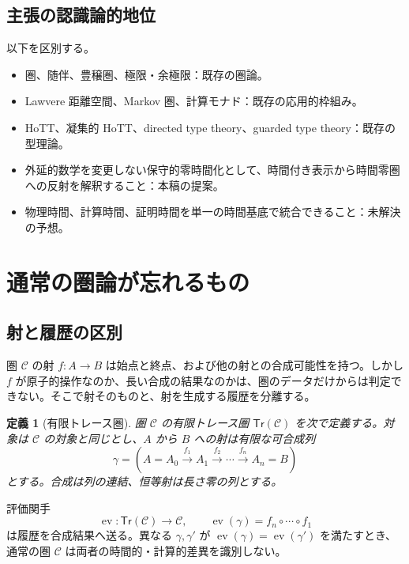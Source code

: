 \documentclass[a4paper,11pt]{ltjsarticle}
\newtheorem{definition}{定義}[section]
\theoremstyle{remark}
\newcommand{\C}{\mathcal C}
\newcommand{\Trc}{\mathsf{Tr}}
\newcommand{\ev}{\operatorname{ev}}
\begin{document}
\subsection{主張の認識論的地位}
以下を区別する。
\begin{itemize}
  \item 圏、随伴、豊穣圏、極限・余極限：既存の圏論。
  \item Lawvere 距離空間、Markov 圏、計算モナド：既存の応用的枠組み。
  \item HoTT、凝集的 HoTT、directed type theory、guarded type theory：既存の型理論。
  \item 外延的数学を変更しない保守的零時間化として、時間付き表示から時間零圏への反射を解釈すること：本稿の提案。
  \item 物理時間、計算時間、証明時間を単一の時間基底で統合できること：未解決の予想。
\end{itemize}

\section{通常の圏論が忘れるもの}

\subsection{射と履歴の区別}
圏 $\C$ の射 $f:A\to B$ は始点と終点、および他の射との合成可能性を持つ。しかし $f$ が原子的操作なのか、長い合成の結果なのかは、圏のデータだけからは判定できない。そこで射そのものと、射を生成する履歴を分離する。

\begin{definition}[有限トレース圏]
圏 $\C$ の有限トレース圏 $\Trc(\C)$ を次で定義する。対象は $\C$ の対象と同じとし、$A$ から $B$ への射は有限な可合成列
\begin{equation}
 \gamma=(A=A_0\xrightarrow{f_1}A_1\xrightarrow{f_2}\cdots
 \xrightarrow{f_n}A_n=B)
 \label{eq:trace}
\end{equation}
とする。合成は列の連結、恒等射は長さ零の列とする。
\end{definition}

評価関手
\begin{equation}
 \ev:\Trc(\C)\longrightarrow\C,
 \qquad
 \ev(\gamma)=f_n\circ\cdots\circ f_1
 \label{eq:evaluation}
\end{equation}
は履歴を合成結果へ送る。異なる $\gamma,\gamma'$ が $\ev(\gamma)=\ev(\gamma')$ を満たすとき、通常の圏 $\C$ は両者の時間的・計算的差異を識別しない。
\end{document}

